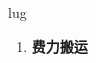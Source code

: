 
\begin{frame}
{\huge lug}
\begin{center}
\begin{enumerate}\Large
  \item \textbf{费力搬运}
\end{enumerate}
\end{center}
\end{frame}
